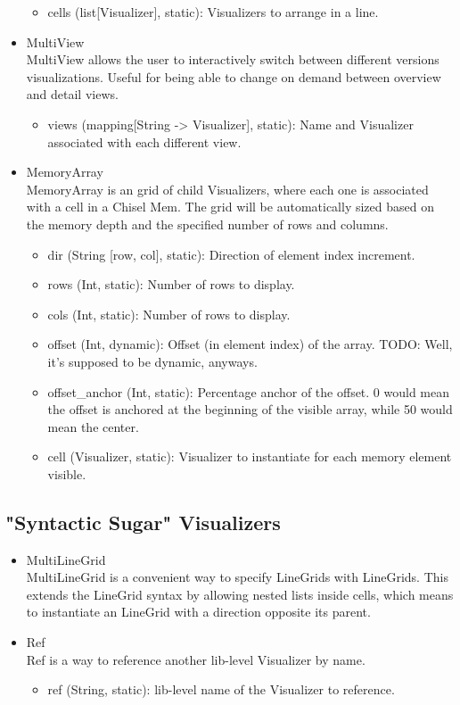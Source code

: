 \documentclass[11pt]{article}
\begin{document}
\begin{itemize}
\begin{itemize}
    \item cells (list[Visualizer], static): Visualizers to arrange in a line.
  \end{itemize}  
  \item MultiView \\
  MultiView allows the user to interactively switch between different versions visualizations. Useful for being able to change on demand between overview and detail views.
  \begin{itemize}
    \item views (mapping[String -> Visualizer], static): Name and Visualizer associated with each different view.
  \end{itemize}
  \item MemoryArray \\
  MemoryArray is an grid of child Visualizers, where each one is associated with a cell in a Chisel Mem. The grid will be automatically sized based on the memory depth and the specified number of rows and columns.
  \begin{itemize}
    \item dir (String [row, col], static): Direction of element index increment.
    \item rows (Int, static): Number of rows to display.
    \item cols (Int, static): Number of rows to display.
    \item offset (Int, dynamic): Offset (in element index) of the array. TODO: Well, it's supposed to be dynamic, anyways.
    \item offset\_anchor (Int, static): Percentage anchor of the offset. 0 would mean the offset is anchored at the beginning of the visible array, while 50 would mean the center.
    \item cell (Visualizer, static): Visualizer to instantiate for each memory element visible.
  \end{itemize}
\end{itemize}

\subsection {"Syntactic Sugar" Visualizers}
\begin{itemize}
  \item MultiLineGrid \\
  MultiLineGrid is a convenient way to specify LineGrids with LineGrids. This extends the LineGrid syntax by allowing nested lists inside cells, which means to instantiate an LineGrid with a direction opposite its parent.
  \item Ref \\
  Ref is a way to reference another lib-level Visualizer by name.
  \begin{itemize}
    \item ref (String, static): lib-level name of the Visualizer to reference.
  \end{itemize}
\end{itemize}
\end{document}
